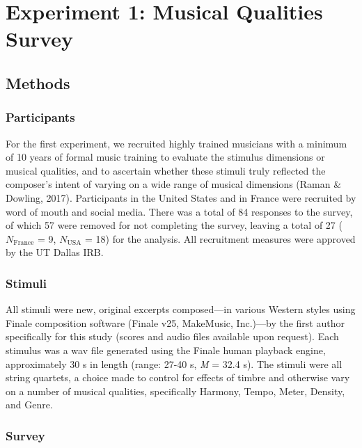 \documentclass[
  english,
  man]{apa6}
\begin{document}
\hypertarget{experiment-1-musical-qualities-survey}{%
\section{Experiment 1: Musical Qualities Survey}\label{experiment-1-musical-qualities-survey}}

\hypertarget{methods}{%
\subsection{Methods}\label{methods}}

\hypertarget{participants}{%
\subsubsection{Participants}\label{participants}}

For the first experiment, we recruited highly trained musicians with a minimum of 10 years of formal music training to evaluate the stimulus dimensions or musical qualities, and to ascertain whether these stimuli truly reflected the composer's intent of varying on a wide range of musical dimensions (Raman \& Dowling, 2017). Participants in the United States and in France were recruited by word of mouth and social media. There was a total of 84 responses to the survey, of which 57 were removed for not completing the survey, leaving a total of 27 (\(N\mathrm{_{France}}\) = 9, \(N\mathrm{_{USA}}\) = 18) for the analysis. All recruitment measures were approved by the UT Dallas IRB.

\hypertarget{stimuli}{%
\subsubsection{Stimuli}\label{stimuli}}

All stimuli were new, original excerpts composed---in various Western styles using Finale composition software (Finale v25, MakeMusic, Inc.)---by the first author specifically for this study (scores and audio files available upon request). Each stimulus was a wav file generated using the Finale human playback engine, approximately 30 s in length (range: 27-40 s, \emph{M} = 32.4 s). The stimuli were all string quartets, a choice made to control for effects of timbre and otherwise vary on a number of musical qualities, specifically Harmony, Tempo, Meter, Density, and Genre.

\hypertarget{survey}{%
\subsubsection{Survey}\label{survey}}
\end{document}
